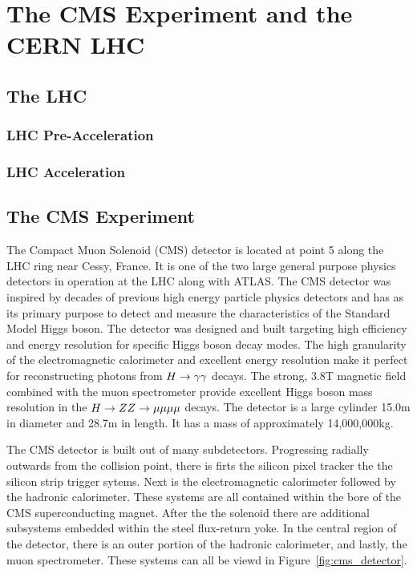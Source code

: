 \chapter{The CMS Experiment and the CERN LHC}

\section{The LHC}

\subsection{LHC Pre-Acceleration}

\subsection{LHC Acceleration}

\section{The CMS Experiment}

The Compact Muon Solenoid (CMS) detector is located at point 5 along the LHC ring near Cessy, France. It is
one of the two large general purpose physics detectors in operation at the LHC along with ATLAS. The
CMS detector was inspired by decades of previous high energy particle physics detectors and has as its
primary purpose to detect and measure the characteristics of the Standard Model Higgs boson. The 
detector was designed and built targeting high efficiency and energy resolution for specific Higgs 
boson decay modes. The high granularity of the electromagnetic calorimeter and excellent energy
resolution make it perfect for reconstructing photons from $H \to \gamma\gamma$ decays. The
strong, 3.8T magnetic field combined with the muon spectrometer provide excellent Higgs boson
mass resolution in the $H \to ZZ \to \mu\mu\mu\mu$ decays. The detector is a large
cylinder 15.0m in diameter and 28.7m in length. It has a mass of approximately 14,000,000kg.

The CMS detector is built out of many subdetectors. Progressing radially outwards from the collision point,
there is firts the silicon pixel tracker the the silicon strip trigger sytems. Next is the 
electromagnetic calorimeter followed by the hadronic calorimeter. These systems are all contained
within the bore of the CMS superconducting magnet. After the the solenoid there are additional subsystems
embedded within the steel flux-return yoke. In the central region of the detector, there is an 
outer portion of the hadronic calorimeter, and lastly, the muon spectrometer. These systems can all be viewd in
Figure~\ref{fig:cms_detector}.

